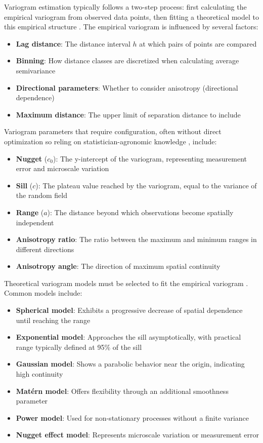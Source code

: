 \documentclass[12pt,a4paper,oneside]{report}
\begin{document}
Variogram estimation typically follows a two-step process: first calculating the 
empirical variogram from observed data points, then fitting a theoretical model to 
this empirical structure \cite{webster_geostatistics_2007, oliver_geostatistics_2010}. 
The empirical variogram is influenced by several factors:

\begin{itemize} 
    \item \textbf{Lag distance}: The distance interval $h$ at which pairs of points are compared 
    \item \textbf{Binning}: How distance classes are discretized when calculating average semivariance 
    \item \textbf{Directional parameters}: Whether to consider anisotropy (directional dependence) 
    \item \textbf{Maximum distance}: The upper limit of separation distance to include 
\end{itemize}

Variogram parameters that require configuration, often without direct 
optimization so reling on statistician-agronomic knowledge
\cite{muller,GSTOOLS}, 
include:

\begin{itemize} 
    \item \textbf{Nugget} ($c_0$): The y-intercept of the variogram, representing measurement error and microscale variation 
    \item \textbf{Sill} ($c$): The plateau value reached by the variogram, equal to the variance of the random field 
    \item \textbf{Range} ($a$): The distance beyond which observations become spatially independent 
    \item \textbf{Anisotropy ratio}: The ratio between the maximum and minimum ranges in different directions 
    \item \textbf{Anisotropy angle}: The direction of maximum spatial continuity 
\end{itemize}

Theoretical variogram models must be selected to fit the empirical variogram
\cite{cressie_statistics_1993, goovaerts_geostatistics_1997}. 
Common models include:

\begin{itemize} 
    \item \textbf{Spherical model}: Exhibits a progressive decrease of spatial dependence until reaching the range 
    \item \textbf{Exponential model}: Approaches the sill asymptotically, with practical range typically defined at 95\% of the sill 
    \item \textbf{Gaussian model}: Shows a parabolic behavior near the origin, indicating high continuity 
    \item \textbf{Matérn model}: Offers flexibility through an additional smoothness parameter 
    \item \textbf{Power model}: Used for non-stationary processes without a finite variance 
    \item \textbf{Nugget effect model}: Represents microscale variation or measurement error 
\end{itemize}
\end{document}
